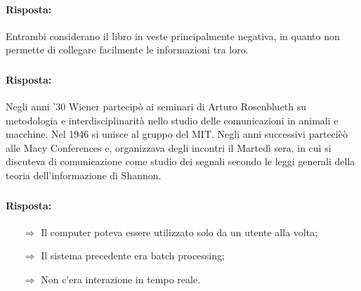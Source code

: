 
\paragraph{Risposta:} Entrambi considerano il libro in veste principalmente negativa,
in quanto non permette di collegare facilmente le informazioni tra loro.

\subsubsection{}


\paragraph{Risposta:} Negli anni '30 Wiener partecipò ai seminari di Arturo Rosenblueth su metodologia e interdisciplinarità
nello studio delle comunicazioni in animali e macchine. Nel 1946 si unisce al gruppo del MIT.
Negli anni successivi partecièò alle Macy Conferences e, organizzava degli incontri il Martedì sera, in cui si 
discuteva di comunicazione come studio dei segnali secondo le leggi generali della teoria dell'informazione di Shannon.

\subsubsection{}


\paragraph{Risposta:}

\begin{itemize}
    \item [$\Rightarrow$] Il computer poteva essere utilizzato solo da un utente alla volta;
    \item [$\Rightarrow$] Il sistema precedente era batch processing;
    \item [$\Rightarrow$] Non c'era interazione in tempo reale.
\end{itemize}

